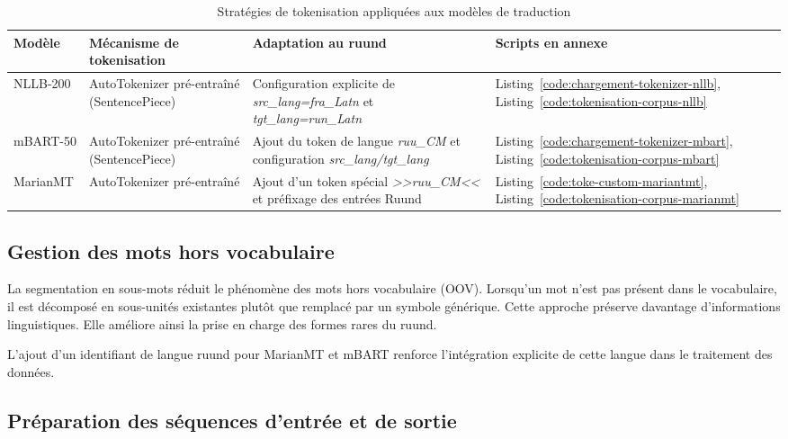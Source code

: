 \begin{table}[H]
\centering
\renewcommand{\arraystretch}{1.5}
\begin{tabular}{p{2.5cm}p{3.7cm}p{4.0cm}p{3.2cm}}
\toprule
\textbf{Modèle} & \textbf{Mécanisme de tokenisation} & \textbf{Adaptation au ruund} & \textbf{Scripts en annexe} \\
\midrule
\ac{NLLB}-200 & AutoTokenizer pré-entraîné (SentencePiece) & Configuration explicite de \textit{src\_lang=fra\_Latn} et \textit{tgt\_lang=run\_Latn} & Listing~\ref{code:chargement-tokenizer-nllb}, Listing~\ref{code:tokenisation-corpus-nllb} \\
\ac{mBART}-50 & AutoTokenizer pré-entraîné (SentencePiece) & Ajout du token de langue \textit{ruu\_CM} et configuration \textit{src\_lang/tgt\_lang} & Listing~\ref{code:chargement-tokenizer-mbart}, Listing~\ref{code:tokenisation-corpus-mbart} \\
\ac{MarianMT} & AutoTokenizer pré-entraîné & Ajout d'un token spécial \textit{>>ruu\_CM<<} et préfixage des entrées Ruund & Listing~\ref{code:toke-custom-mariantmt}, Listing~\ref{code:tokenisation-corpus-marianmt} \\
\bottomrule
\end{tabular}
\caption{Stratégies de tokenisation appliquées aux modèles de traduction}
\label{tab:tokenizers_modeles}
\end{table}

\subsection{Gestion des mots hors vocabulaire}
\label{subsec:oov}

La segmentation en sous-mots réduit le phénomène des mots hors vocabulaire (\ac{OOV}). Lorsqu'un mot n'est pas présent dans le vocabulaire, il est décomposé en sous-unités existantes plutôt que remplacé par un symbole générique. Cette approche préserve davantage d'informations linguistiques. Elle améliore ainsi la prise en charge des formes rares du ruund.

L'ajout d'un identifiant de langue ruund pour \ac{MarianMT} et \ac{mBART} renforce l'intégration explicite de cette langue dans le traitement des données.

\subsection{Préparation des séquences d'entrée et de sortie}
\label{subsec:sequences}


